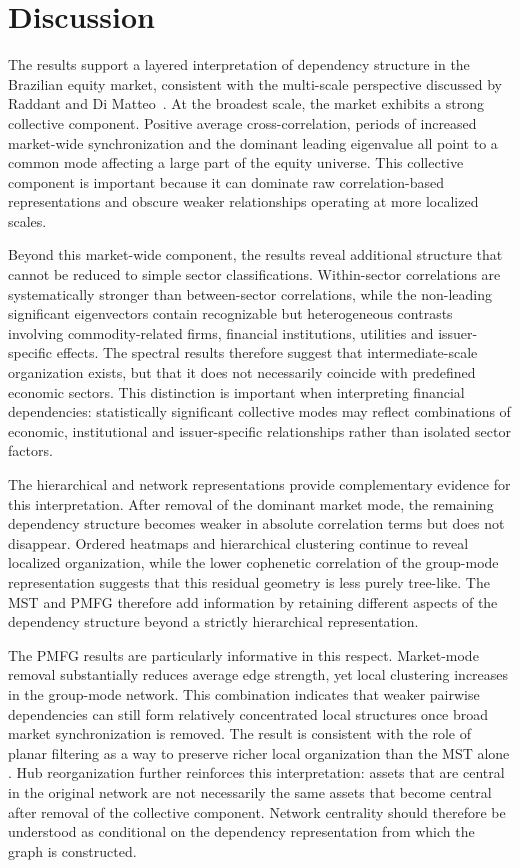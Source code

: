 \section{Discussion}
\label{sec:discussion}

The results support a layered interpretation of dependency structure in the Brazilian equity market, consistent with the multi-scale perspective discussed by Raddant and Di Matteo~\cite{raddant_dimatteo_2023}. At the broadest scale, the market exhibits a strong collective component. Positive average cross-correlation, periods of increased market-wide synchronization and the dominant leading eigenvalue all point to a common mode affecting a large part of the equity universe. This collective component is important because it can dominate raw correlation-based representations and obscure weaker relationships operating at more localized scales.

Beyond this market-wide component, the results reveal additional structure that cannot be reduced to simple sector classifications. Within-sector correlations are systematically stronger than between-sector correlations, while the non-leading significant eigenvectors contain recognizable but heterogeneous contrasts involving commodity-related firms, financial institutions, utilities and issuer-specific effects. The spectral results therefore suggest that intermediate-scale organization exists, but that it does not necessarily coincide with predefined economic sectors. This distinction is important when interpreting financial dependencies: statistically significant collective modes may reflect combinations of economic, institutional and issuer-specific relationships rather than isolated sector factors.

The hierarchical and network representations provide complementary evidence for this interpretation. After removal of the dominant market mode, the remaining dependency structure becomes weaker in absolute correlation terms but does not disappear. Ordered heatmaps and hierarchical clustering continue to reveal localized organization, while the lower cophenetic correlation of the group-mode representation suggests that this residual geometry is less purely tree-like. The MST and PMFG therefore add information by retaining different aspects of the dependency structure beyond a strictly hierarchical representation.

The PMFG results are particularly informative in this respect. Market-mode removal substantially reduces average edge strength, yet local clustering increases in the group-mode network. This combination indicates that weaker pairwise dependencies can still form relatively concentrated local structures once broad market synchronization is removed. The result is consistent with the role of planar filtering as a way to preserve richer local organization than the MST alone \cite{tumminello_2005_tool,tumminello_2010_correlation}. Hub reorganization further reinforces this interpretation: assets that are central in the original network are not necessarily the same assets that become central after removal of the collective component. Network centrality should therefore be understood as conditional on the dependency representation from which the graph is constructed.

